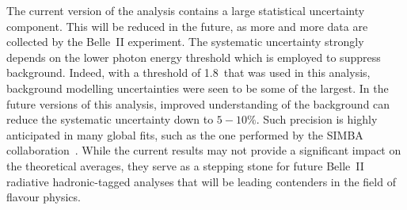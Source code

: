 \begin{table}[hbtp!]
    \caption{\label{tab:compilation_results} Compilation of several highlight results of presented the thesis.}
\end{table}

The current version of the analysis contains a large statistical uncertainty component. 
This will be reduced in the future, as more and more data are collected by the Belle~II experiment.
The systematic uncertainty strongly depends on the lower photon energy threshold which is employed to suppress background.
Indeed, with a threshold of 1.8~\gev that was used in this analysis, background modelling uncertainties were seen to be some of the largest.
In the future versions of this analysis, improved understanding of the background can reduce the systematic uncertainty down to $5-10\%$.
Such precision is highly anticipated in many global fits, such as the one performed by the SIMBA collaboration~\cite{Bernlochner:2020jlt}.
While the current results may not provide a significant impact on the theoretical averages, they serve as a stepping stone for future Belle~II radiative hadronic-tagged analyses that will be leading contenders in the field of flavour physics.






